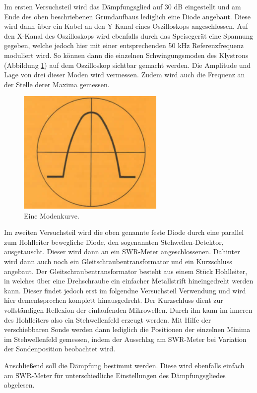 Im ersten Versuchsteil wird das Dämpfungsglied auf 30 dB eingestellt und
am Ende des oben beschriebenen Grundaufbaus lediglich eine Diode angebaut.
Diese wird dann über ein Kabel an den Y-Kanal eines
Oszilloskops angeschlossen. Auf den X-Kanal des Oszilloskops wird ebenfalls durch
das Speisegerät eine Spannung gegeben, welche jedoch hier mit einer entsprechenden
50 kHz Referenzfrequenz moduliert wird. So können dann die einzelnen Schwingungsmoden
des Klystrons (Abbildung \ref{fig:mode}) auf dem Oszilloskop sichtbar gemacht werden. Die Amplitude und Lage
von drei dieser Moden wird vermessen. Zudem wird auch die Frequenz an der
Stelle derer Maxima gemessen.

\begin{figure}[H]
  \centering
  \includegraphics[height=6cm]{Mode.PNG}
  \caption{Eine Modenkurve. \cite{sample}}
  \label{fig:mode}
\end{figure}

Im zweiten Versuchsteil wird die oben genannte feste Diode durch eine parallel
zum Hohlleiter bewegliche Diode, den sogenannten Stehwellen-Detektor, ausgetauscht. Dieser wird dann an ein SWR-Meter angeschlossenen.
Dahinter wird dann auch noch ein Gleitschraubentransformator und ein Kurzschluss angebaut.
Der Gleitschraubentransformator besteht aus einem Stück Hohlleiter, in welches über eine Drehschraube ein einfacher
Metallstrift hineingedreht werden kann. Dieser findet jedoch erst im folgendne Versuchsteil
Verwendung und wird hier dementsprechen komplett hinausgedreht. Der Kurzschluss
dient zur vollständigen Reflexion der einlaufenden Mikrowellen. Durch ihn kann
im inneren des Hohlleiters also ein Stehwellenfeld erzeugt werden. Mit Hilfe der
verschiebbaren Sonde werden dann lediglich die Positionen der einzelnen Minima
im Stehwellenfeld gemessen, indem der Ausschlag am SWR-Meter bei Variation der
Sondenposition beobachtet wird.

Anschließend soll die Dämpfung bestimmt werden. Diese wird ebenfalls einfach am
SWR-Meter für unterschiedliche Einstellungen des Dämpfungsgliedes abgelesen.

